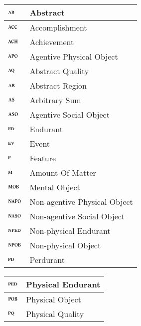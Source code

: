 \documentclass[ao]{iosart2x}
\newcommand{\dolce}{{\textsc{dolce}}}
\newcommand {\ABdcat} {\textsc{ab}}
\newcommand {\AQdcat} {\textsc{aq}}
\newcommand {\ARdcat} {\textsc{ar}}
\newcommand {\ACHdcat} {\textsc{ach}}
\newcommand {\ACCdcat} {\textsc{acc}}
\newcommand {\APOdcat} {\textsc{apo}}
\newcommand {\ASOdcat} {\textsc{aso}}
\newcommand {\Mdcat} {\textsc{m}}
\newcommand {\ASdcat} {\textsc{as}}
\newcommand {\EDdcat} {\textsc{ed}}
\newcommand {\EVdcat} {\textsc{ev}}
\newcommand {\Fdcat} {\textsc{f}}
\newcommand {\MOBdcat} {\textsc{mob}}
\newcommand {\NAPOdcat} {\textsc{napo}}
\newcommand {\NASOdcat} {\textsc{naso}}
\newcommand {\NPEDdcat} {\textsc{nped}}
\newcommand {\NPOBdcat} {\textsc{npob}}
\newcommand {\PDdcat} {\textsc{pd}}
\newcommand {\PEDdcat} {\textsc{ped}}
\newcommand {\POBdcat} {\textsc{pob}}
\newcommand {\PQdcat} {\textsc{pq}}
\begin{document}

\begin{table*}
\caption{Categories of {\dolce}.}\label{table_cat_dolce}
\begin{minipage}{0.45\textwidth}
\hspace{30pt}\begin{tabular}{|p{}|p{}|}
\hline
$\ABdcat$ & Abstract \\
\hline
$\ACCdcat$ & Accomplishment \\
\hline
$\ACHdcat$ & Achievement \\
\hline
$\APOdcat$ & Agentive Physical Object \\
\hline
$\AQdcat$ & Abstract Quality\\
\hline
$\ARdcat$ & Abstract Region\\
\hline
$\ASdcat$ & Arbitrary Sum \\
\hline
$\ASOdcat$ & Agentive Social Object \\
\hline
$\EDdcat$ & Endurant \\
\hline
$\EVdcat$ & Event \\
\hline
$\Fdcat$ & Feature \\
\hline
$\Mdcat$ & Amount Of Matter \\
\hline
$\MOBdcat$ & Mental Object \\
\hline
$\NAPOdcat$ & Non-agentive Physical Object \\
\hline
$\NASOdcat$ & Non-agentive Social Object \\
\hline
$\NPEDdcat$ & Non-physical Endurant \\
\hline
$\NPOBdcat$ & Non-physical Object \\
\hline
$\PDdcat$ & Perdurant \\
\hline
\end{tabular}
\end{minipage}%
\mbox{}\hfill{}
\begin{minipage}{0.45\textwidth}
\hspace{-30pt}\begin{tabular}{|p{}|p{}|}
\hline
$\PEDdcat$ & Physical Endurant \\
\hline
$\POBdcat$ & Physical Object \\
\hline
$\PQdcat$ & Physical Quality\\

\end{tabular}
\end{minipage}
\end{table*}
\end{document}
